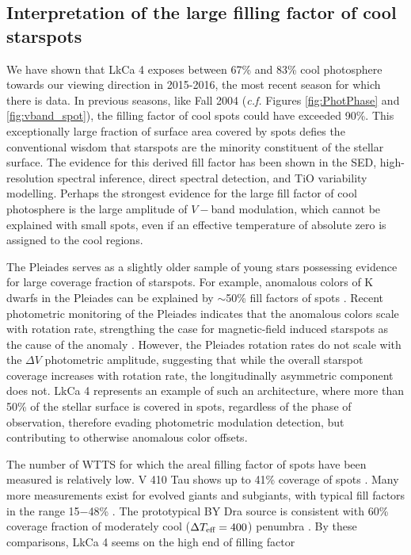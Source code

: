 \documentclass[12pt]{report}
\begin{document}
\subsection{Interpretation of the large filling factor of cool starspots}
We have shown that LkCa 4 exposes between 67\% and 83\% cool photosphere towards our viewing direction in 2015-2016, the most recent season for which there is data.  In previous seasons, like Fall 2004 (\emph{c.f.} Figures \ref{fig:PhotPhase} and \ref{fig:vband_spot}), the filling factor of cool spots could have exceeded 90\%.  This exceptionally large fraction of surface area covered by spots defies the conventional wisdom that starspots are the minority constituent of the stellar surface.  The evidence for this derived fill factor has been shown in the SED, high-resolution spectral inference, direct spectral detection, and TiO variability modelling.  Perhaps the strongest evidence for the large fill factor of cool photosphere is the large amplitude of $V-$band modulation, which cannot be explained with small spots, even if an effective temperature of absolute zero is assigned to the cool regions.

The Pleiades serves as a slightly older sample of young stars possessing evidence for large coverage fraction of starspots.  For example, anomalous colors of K dwarfs in the Pleiades can be explained by $\sim$50\% fill factors of spots \citep{stauffer03}.  Recent photometric monitoring of the Pleiades indicates that the anomalous colors scale with rotation rate, strengthing the case for magnetic-field induced starspots as the cause of the anomaly \citep{covey16}.  However, the \citet{covey16} Pleiades rotation rates do not scale with the $\Delta V$ photometric amplitude, suggesting that while the overall starspot coverage increases with rotation rate, the longitudinally asymmetric component does not.  LkCa 4 represents an example of such an architecture, where more than 50\% of the stellar surface is covered in spots, regardless of the phase of observation, therefore evading photometric modulation detection, but contributing to otherwise anomalous color offsets.

The number of WTTS for which the areal filling factor of spots have been measured is relatively low.  V 410 Tau shows up to 41\% coverage of spots \citep{petrov94}.  Many more measurements exist for evolved giants and subgiants, with typical fill factors in the range 15$-$48\% \citep{berdyugina05}.  The prototypical BY Dra source is consistent with 60\% coverage fraction of moderately cool ($\Delta T_\textrm{eff} =400$) penumbra \citep{chugainov76}.  By these comparisons, LkCa 4 seems on the high end of filling factor
\end{document}
